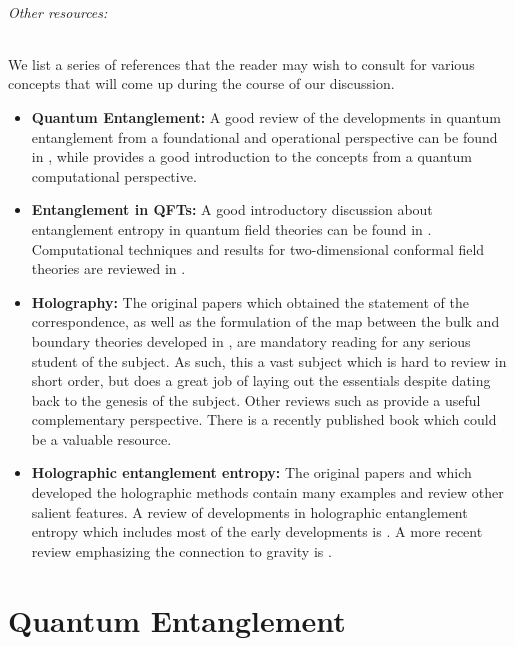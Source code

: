\documentclass[12pt,openany]{book}
\begin{document}
\paragraph{Other resources:} We list a series of references that the reader may wish to consult for various concepts that will come up during the course of our discussion.
\begin{itemize}
\item {\bf Quantum Entanglement:} A good review of the developments in quantum entanglement  from a foundational and operational perspective can be found in \cite{Horodecki:2009aa}, while \cite{Nielsen:2010aa}  provides a good introduction to the concepts from a quantum computational perspective.

\item {\bf Entanglement in QFTs:} A good introductory discussion about entanglement entropy in quantum field theories can be found in \cite{Calabrese:2005zw}. Computational techniques and results for two-dimensional conformal field theories are reviewed in \cite{Calabrese:2009qy}.

\item {\bf Holography:} The original papers \cite{Maldacena:1997re} which obtained the statement of the correspondence, as well as the formulation of the map between the bulk and boundary theories developed in
\cite{Gubser:1998bc,Witten:1998qj}, are mandatory reading for any serious student of the subject.
As such, this a vast subject which is hard to review in short order, but \cite{Aharony:1999ti} does a great job of laying out the essentials despite dating back to the genesis of the subject. Other reviews such as \cite{DHoker:2002aw} provide a useful complementary perspective.  There is a recently published book \cite{Ammon:2015wua} which could be a valuable resource.

\item {\bf Holographic entanglement entropy:} The original papers \cite{Ryu:2006bv} and \cite{Hubeny:2007xt} which developed the holographic methods contain many examples and review other salient features.  A review of developments in holographic entanglement entropy which includes most of the early developments is \cite{Nishioka:2009un}. A more recent review emphasizing the connection to gravity is \cite{VanRaamsdonk:2016exw}.
\end{itemize}



\part{Quantum Entanglement}
\label{part:ee}
\end{document}
